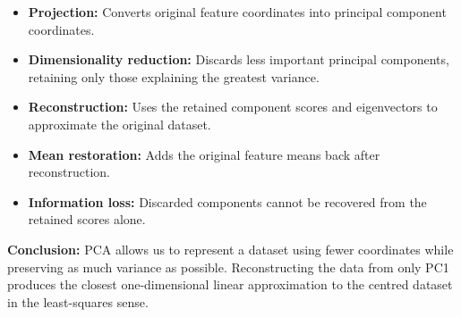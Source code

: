 \documentclass[11pt]{article}
\providecommand{\tightlist}{%
      \setlength{\itemsep}{0pt}\setlength{\parskip}{0pt}}
\begin{document}
\begin{itemize}
\tightlist
\item
  \textbf{Projection:} Converts original feature coordinates into
  principal component coordinates.
\item
  \textbf{Dimensionality reduction:} Discards less important principal
  components, retaining only those explaining the greatest variance.
\item
  \textbf{Reconstruction:} Uses the retained component scores and
  eigenvectors to approximate the original dataset.
\item
  \textbf{Mean restoration:} Adds the original feature means back after
  reconstruction.
\item
  \textbf{Information loss:} Discarded components cannot be recovered
  from the retained scores alone.
\end{itemize}

\textbf{Conclusion:} PCA allows us to represent a dataset using fewer
coordinates while preserving as much variance as possible.
Reconstructing the data from only PC1 produces the closest
one-dimensional linear approximation to the centred dataset in the
least-squares sense.
\end{document}

